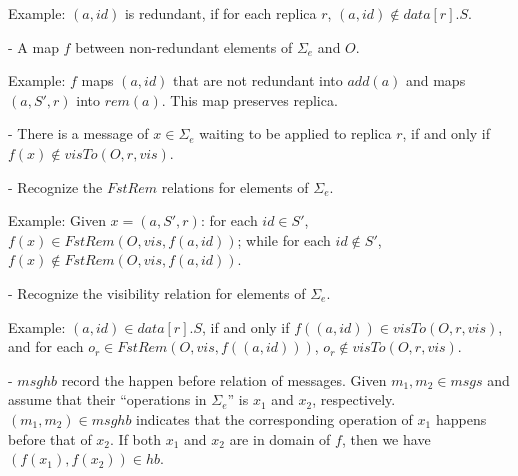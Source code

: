 Example: $(a,\mathit{id})$ is redundant, if for each replica $r$, $(a,\mathit{id}) \notin \mathit{data}[r].S$.

\noindent - A map $f$ between non-redundant elements of $\Sigma_e$ and $O$.%

Example: $f$ maps $(a,\mathit{id})$ that are not redundant into $\mathit{add}(a)$ and maps $(a,S',r)$ into $\mathit{rem}(a)$. This map preserves replica. 


\noindent - There is a message of $x \in \Sigma_e$ waiting to be applied to replica $r$, if and only if $f(x) \notin \mathit{visTo}(O,r,\mathit{vis})$.

\noindent - Recognize the $\mathit{FstRem}$ relations for elements of $\Sigma_e$.

Example: Given $x=(a,S',r)$: for each $\mathit{id} \in S'$, $f(x) \in \mathit{FstRem}(O,\mathit{vis},f(a,\mathit{id}))$; while for each $\mathit{id} \notin S'$, $f(x) \notin \mathit{FstRem}(O,\mathit{vis},f(a,\mathit{id}))$.

\noindent - Recognize the visibility relation for elements of $\Sigma_e$.

Example: $(a,\mathit{id}) \in data[r].S$, if and only if $f((a,\mathit{id})) \in \mathit{visTo}(O,r,\mathit{vis})$, and for each $o_r \in \mathit{FstRem}(O,\mathit{vis},f((a,\mathit{id})))$, $o_r \notin \mathit{visTo}(O,r,\mathit{vis})$.

\noindent - {\color {red}$\mathit{msghb}$ record the happen before relation of messages. Given $m_1,m_2 \in \mathit{msgs}$ and assume that their ``operations in $\Sigma_e$'' is $x_1$ and $x_2$, respectively. $(m_1,m_2) \in \mathit{msghb}$ indicates that the corresponding operation of $x_1$ happens before that of $x_2$. If both $x_1$ and $x_2$ are in domain of $f$, then we have $(f(x_1),f(x_2)) \in \mathit{hb}$.}



